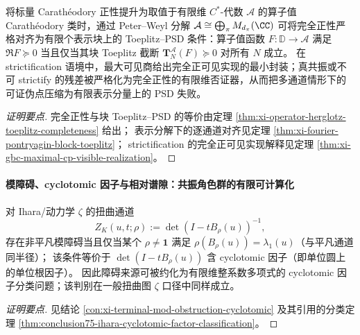 

\begin{conclusion}\label{con:xi-operator-valued-horizon-cp-falsifier}
将标量 Carath\'eodory 正性提升为取值于有限维 \(C^\ast\)-代数 \(\mathcal{A}\) 的算子值 Carath\'eodory 类时，通过 Peter--Weyl 分解
\(
\mathcal{A}\cong\bigoplus_{\pi}M_{d_\pi}(\CC)
\)
可将完全正性严格对齐为有限个表示块上的 Toeplitz--PSD 条件：算子值函数 \(F:\mathbb{D}\to\mathcal{A}\) 满足 \(\Re F\succeq 0\) 当且仅当其块 Toeplitz 截断 \(\mathbf{T}^{\mathcal{A}}_N(F)\succeq 0\) 对所有 \(N\) 成立。
在 strictification 语境中，最大可见商给出完全正可见实现的最小封装；真共振或不可 strictify 的残差被严格化为完全正性的有限维否证器，从而把多通道情形下的可证伪点压缩为有限表示分量上的 PSD 失败。
\end{conclusion}
\begin{proof}[证明要点]
完全正性与块 Toeplitz--PSD 的等价由定理 \ref{thm:xi-operator-herglotz-toeplitz-completeness} 给出；
表示分解下的逐通道对齐见定理 \ref{thm:xi-fourier-pontryagin-block-toeplitz}；
strictification 的完全正可见实现解释见定理 \ref{thm:xi-gbc-maximal-cp-visible-realization}。
\end{proof}

\paragraph{模障碍、cyclotomic 因子与相对谱隙：共振角色群的有限可计算化}

\begin{conclusion}\label{con:xi-mod-obstruction-cyclotomic-factor}
对 Ihara/动力学 \(\zeta\) 的扭曲通道
\[
Z_K(u,t;\rho):=\det(I-tB_\rho(u))^{-1},
\]
存在非平凡模障碍当且仅当某个 \(\rho\neq \mathbf{1}\) 满足 \(\rho(B_\rho(u))=\lambda_1(u)\)（与平凡通道同半径）；
该条件等价于 \(\det(I-tB_\rho(u))\) 含 cyclotomic 因子（即单位圆上的单位根因子）。
因此障碍来源可被约化为有限维整系数多项式的 cyclotomic 因子分类问题；该判别在一般扭曲图 \(\zeta\) 口径中同样成立。
\end{conclusion}
\begin{proof}[证明要点]
见结论 \ref{con:xi-terminal-mod-obstruction-cyclotomic} 及其引用的分类定理 \ref{thm:conclusion75-ihara-cyclotomic-factor-classification}。
\end{proof}

